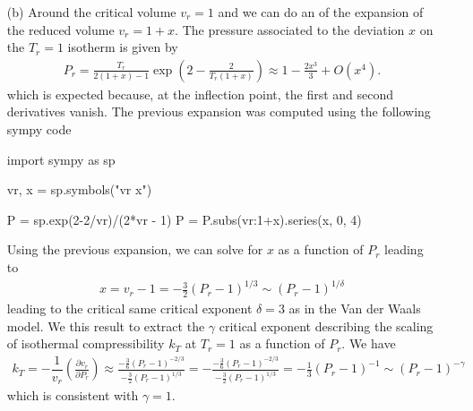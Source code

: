 \documentclass[10pt, a4paper]{article}
\begin{document}
{\begin{enumerate}
\begin{python}
del1P = sp.diff(P, v, 1).simplify()
  \end{python}
Solving for the critical volume $v_c$ yields 
\begin{align*}
  0 = -\frac{a}{4k b} k v_c^{2} - a \left(b - v_c\right) \iff 0 = v_c^{2} + 4 b^2 - 4 v_c b = (v_c - 2 b)^2 \iff v_c = 2b. 
\end{align*}
The associated critical pressure is obtained by substituting the expression for $v_c$ and $T_c$ in $P(v)$. We get 
\begin{align*}
  P_c = \dfrac{ka}{4k (2b-b)b} \exp\left(-\frac{4k ab}{2k ab}\right) = \dfrac{a}{4b^2} \exp\left(-2\right). 
\end{align*} 
To simplify further calculations we reexpress the equation of states with reduced pressure volume $v_r = v/v_c$, $P_r = P/P_c$ and $T_r = T/T_c$. 
\begin{align*}
  P_r = \frac{P}{P_c} = \frac{kT}{b(2v_r-1)} \exp\left(-\frac{2a}{4 b kT v_r}\right) \dfrac{4b^2}{a} \exp\left(+2\right) = \frac{T_r}{2v_r-1} \exp\left(2-\frac{2}{T_r v_r}\right).
\end{align*} 
\newpage
  \item[(b)] Around the critical volume $v_r = 1$ and we can do an of the expansion of the reduced volume $v_r = 1 + x$. The pressure associated to the deviation $x$ on the $T_r=1$ isotherm is given by 
  \begin{align*}
    P_r = \frac{T_r}{2(1+x)-1} \exp\left(2-\frac{2}{T_r (1+x)}\right) \approx 1 - \frac{2 x^{3}}{3} + O\left(x^{4}\right).  
  \end{align*}
  which is expected because, at the inflection point, the first and second derivatives vanish. The previous expansion was computed using the following sympy code 
  \begin{python}
import sympy as sp 

vr, x = sp.symbols("vr x")

P = sp.exp(2-2/vr)/(2*vr - 1)
P = P.subs({vr:1+x}).series(x, 0, 4)
  \end{python}
  Using the previous expansion, we can solve for $x$ as a function of $P_r$ leading to 
  \begin{align*}
    x = v_r-1 = -\frac{3}{2}\left(P_r - 1\right)^{1/3} \sim \left(P_r - 1\right)^{1/\delta}
  \end{align*}
  leading to the critical same critical exponent $\delta = 3$ as in the Van der Waals model. We this result to extract the $\gamma$ critical exponent describing the scaling of isothermal compressibility $k_T$ at $T_r = 1$ as a function of $P_r$. We have 
  \begin{align*}
    k_T = -\dfrac{1}{v_r}\left(\frac{\partial v_r}{\partial P_r}\right) \approx \frac{-\frac{3}{6}\left(P_r - 1\right)^{-2/3}}{-\frac{3}{2}\left(P_r - 1\right)^{1/3}} = -\frac{-\frac{3}{6}\left(P_r - 1\right)^{-2/3}}{-\frac{3}{2}\left(P_r - 1\right)^{1/3}} = -\frac{1}{3} \left(P_r - 1\right)^{-1} \sim (P_r - 1)^{-\gamma}
  \end{align*}
  which is consistent with $\gamma = 1$. 



\end{enumerate}}
\end{document}

